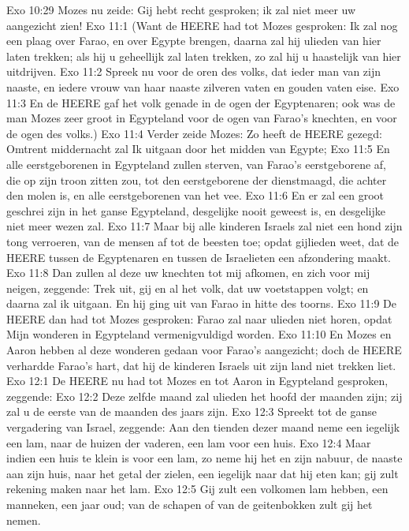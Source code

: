 Exo 10:29  Mozes nu zeide: Gij hebt recht gesproken; ik zal niet meer uw aangezicht zien!
Exo 11:1  (Want de HEERE had tot Mozes gesproken: Ik zal nog een plaag over Farao, en over Egypte brengen, daarna zal hij ulieden van hier laten trekken; als hij u geheellijk zal laten trekken, zo zal hij u haastelijk van hier uitdrijven.
Exo 11:2  Spreek nu voor de oren des volks, dat ieder man van zijn naaste, en iedere vrouw van haar naaste zilveren vaten en gouden vaten eise.
Exo 11:3  En de HEERE gaf het volk genade in de ogen der Egyptenaren; ook was de man Mozes zeer groot in Egypteland voor de ogen van Farao's knechten, en voor de ogen des volks.)
Exo 11:4  Verder zeide Mozes: Zo heeft de HEERE gezegd: Omtrent middernacht zal Ik uitgaan door het midden van Egypte;
Exo 11:5  En alle eerstgeborenen in Egypteland zullen sterven, van Farao's eerstgeborene af, die op zijn troon zitten zou, tot den eerstgeborene der dienstmaagd, die achter den molen is, en alle eerstgeborenen van het vee.
Exo 11:6  En er zal een groot geschrei zijn in het ganse Egypteland, desgelijke nooit geweest is, en desgelijke niet meer wezen zal.
Exo 11:7  Maar bij alle kinderen Israels zal niet een hond zijn tong verroeren, van de mensen af tot de beesten toe; opdat gijlieden weet, dat de HEERE tussen de Egyptenaren en tussen de Israelieten een afzondering maakt.
Exo 11:8  Dan zullen al deze uw knechten tot mij afkomen, en zich voor mij neigen, zeggende: Trek uit, gij en al het volk, dat uw voetstappen volgt; en daarna zal ik uitgaan. En hij ging uit van Farao in hitte des toorns.
Exo 11:9  De HEERE dan had tot Mozes gesproken: Farao zal naar ulieden niet horen, opdat Mijn wonderen in Egypteland vermenigvuldigd worden.
Exo 11:10  En Mozes en Aaron hebben al deze wonderen gedaan voor Farao's aangezicht; doch de HEERE verhardde Farao's hart, dat hij de kinderen Israels uit zijn land niet trekken liet.
Exo 12:1  De HEERE nu had tot Mozes en tot Aaron in Egypteland gesproken, zeggende:
Exo 12:2  Deze zelfde maand zal ulieden het hoofd der maanden zijn; zij zal u de eerste van de maanden des jaars zijn.
Exo 12:3  Spreekt tot de ganse vergadering van Israel, zeggende: Aan den tienden dezer maand neme een iegelijk een lam, naar de huizen der vaderen, een lam voor een huis.
Exo 12:4  Maar indien een huis te klein is voor een lam, zo neme hij het en zijn nabuur, de naaste aan zijn huis, naar het getal der zielen, een iegelijk naar dat hij eten kan; gij zult rekening maken naar het lam.
Exo 12:5  Gij zult een volkomen lam hebben, een manneken, een jaar oud; van de schapen of van de geitenbokken zult gij het nemen.
